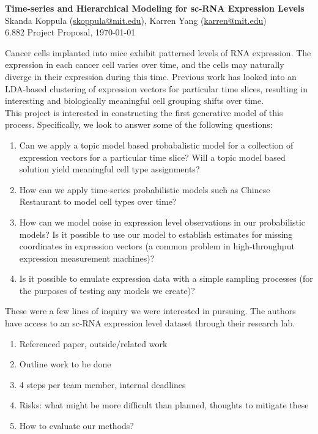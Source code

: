 \documentclass[11pt]{article}
\begin{document}
\begin{centering}
\Large
    \textbf{Time-series and Hierarchical Modeling for sc-RNA Expression Levels}  \\
    \vspace{2mm}
    \normalsize
    Skanda Koppula (\url{skoppula@mit.edu}), Karren Yang (\url{karren@mit.edu}) \\
    \vspace{2mm}
    \normalsize
    6.882 Project Proposal, \today \\
\end{centering}
\vspace{5mm}

Cancer cells implanted into mice exhibit patterned levels of RNA expression. The expression in each cancer cell varies over time, and the cells may naturally diverge in their expression during this time. Previous work has looked into an LDA-based clustering of expression vectors for particular time slices, resulting in interesting and biologically meaningful cell grouping shifts over time. \\

This project is interested in constructing the first generative model of this process. Specifically, we look to answer some of the following questions: 
\begin{enumerate}
\item Can we apply a topic model based probabalistic model for a collection of expression vectors for a particular time slice? Will a topic model based solution yield meaningful cell type assignments?
\item How can we apply time-series probabilistic models such as Chinese Restaurant to model cell types over time?
\item How can we model noise in expression level observations in our probabilistic models? Is it possible to use our model to establish estimates for missing coordinates in expression vectors (a common problem in high-throughput expression measurement machines)?
\item Is it possible to emulate expression data with a simple sampling processes (for the purposes of testing any models we create)?
\end{enumerate}
These were a few lines of inquiry we were interested in pursuing. The authors have access to an sc-RNA expression level dataset through their research lab.


\begin{enumerate}
    \item Referenced paper, outside/related work
    \item Outline work to be done
    \item 4 steps per team member, internal deadlines
    \item Risks: what might be more difficult than planned, thoughts to mitigate these
    \item How to evaluate our methods?
\end{enumerate}
\end{document}
